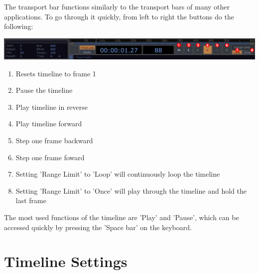 \begin{fullwidth}

The transport bar functions similarly to the transport bars of many other applications. To go through it quickly, from left to right the buttons do the following:

\begin{center}
\includegraphics{./img/2.3/transport-1.png}
\end{center}

\begin{enumerate}
\item Resets timeline to frame 1
\item Pause the timeline
\item Play timeline in reverse
\item Play timeline forward
\item Step one frame backward
\item Step one frame foward
\item Setting 'Range Limit' to 'Loop' will continuously loop the timeline
\item Setting 'Range Limit' to 'Once' will play through the timeline and hold the last frame
\end{enumerate}

The most used functions of the timeline are 'Play' and 'Pause', which can be accessed quickly by pressing the 'Space bar' on the keyboard.

\end{fullwidth}
\section{Timeline Settings}

